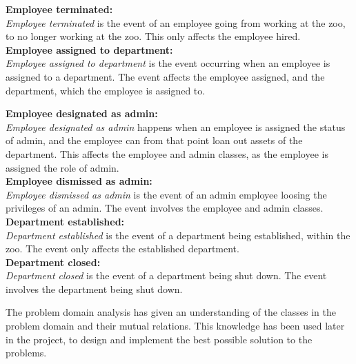\textbf{Employee terminated:}\\
\textit{Employee terminated} is the event of an employee going from working at the zoo, to no longer working at the zoo. This only affects the employee hired.\\

\textbf{Employee assigned to department:}\\
\textit{Employee assigned to department} is the event occurring when an employee is assigned to a department. The event affects the employee assigned, and the department, which the employee is assigned to.

\textbf{Employee designated as admin:}\\
\textit{Employee designated as admin} happens when an employee is assigned the status of admin, and the employee can from that point loan out assets of the department. This affects the employee and admin classes, as the employee is assigned the role of admin.\\

\textbf{Employee dismissed as admin:}\\
\textit{Employee dismissed as admin} is the event of an admin employee loosing the privileges of an admin. The event involves the employee and admin classes.\\

\textbf{Department established:}\\
\textit{Department established} is the event of a department being established, within the zoo. The event only affects the established department.\\

\textbf{Department closed:}\\
\textit{Department closed} is the event of a department being shut down. The event involves the department being shut down.\\
\par

The problem domain analysis has given an understanding of the classes in the problem domain and their mutual relations. This knowledge has been used later in the project, to design and implement the best possible solution to the problems.